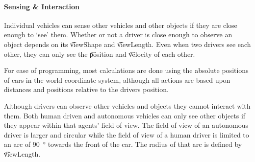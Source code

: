

\paragraph{Sensing \& Interaction} 
Individual vehicles can sense other vehicles and other objects if they are close enough to `see' them. Whether or not a driver is close enough to observe an object depends on its \t{viewShape} and \t{viewLength}. Even when two drivers see each other, they can only see the \t{position} and \t{velocity} of each other.

For ease of programming, most calculations are done using the absolute positions of cars in the world coordinate system, although all actions are based upon distances and positions relative to the drivers position.

Although drivers can observe other vehicles and objects they cannot interact with them. Both human driven and autonomous vehicles can only see other objects if they appear within that agents' field of view. The field of view of an autonomous driver is larger and circular while the field of view of a human driver is limited to an arc of \si{90\degree} towards the front of the car. The radius of that arc is defined by \t{viewLength}.


